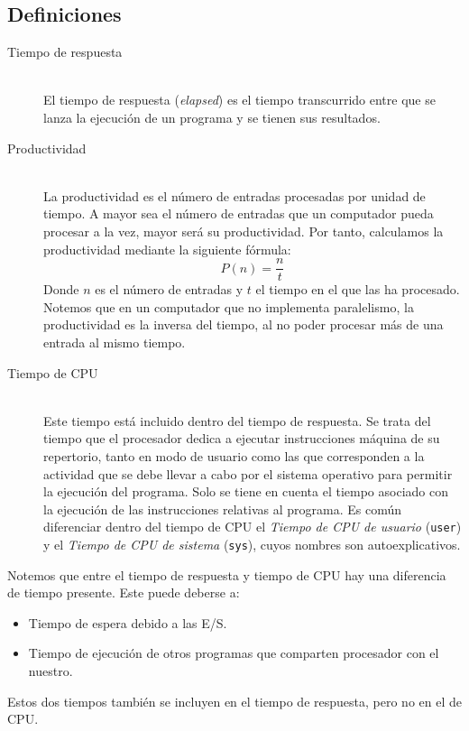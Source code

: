 \subsection{Definiciones}
\begin{description}
    \item [Tiempo de respuesta]~\\
        El tiempo de respuesta (\emph{elapsed}) es el tiempo transcurrido entre que se lanza la ejecución de un programa y se tienen sus resultados.
    \item [Productividad]~\\
        La productividad es el número de entradas procesadas por unidad de tiempo. A mayor sea el número de entradas que un computador pueda procesar a la vez, mayor será su productividad. Por tanto, calculamos la productividad mediante la siguiente fórmula:
        \begin{equation}
            P(n) = \dfrac{n}{t}
        \end{equation}
        Donde $n$ es el número de entradas y $t$ el tiempo en el que las ha procesado. Notemos que en un computador que no implementa paralelismo, la productividad es la inversa del tiempo, al no poder procesar más de una entrada al mismo tiempo.
    \item [Tiempo de CPU]~\\
        Este tiempo está incluido dentro del tiempo de respuesta. Se trata del tiempo que el procesador dedica a ejecutar instrucciones máquina de su repertorio, tanto en modo de usuario como las que corresponden a la actividad que se debe llevar a cabo por el sistema operativo para permitir la ejecución del programa. Solo se tiene en cuenta el tiempo asociado con la ejecución de las instrucciones relativas al programa. Es común diferenciar dentro del tiempo de CPU el \emph{Tiempo de CPU de usuario} (\verb|user|) y el \emph{Tiempo de CPU de sistema} (\verb|sys|), cuyos nombres son autoexplicativos.
\end{description}
Notemos que entre el tiempo de respuesta y tiempo de CPU hay una diferencia de tiempo presente. Este puede deberse a:
\begin{itemize}
    \item Tiempo de espera debido a las E/S.
    \item Tiempo de ejecución de otros programas que comparten procesador con el nuestro.
\end{itemize}
Estos dos tiempos también se incluyen en el tiempo de respuesta, pero no en el de CPU.

